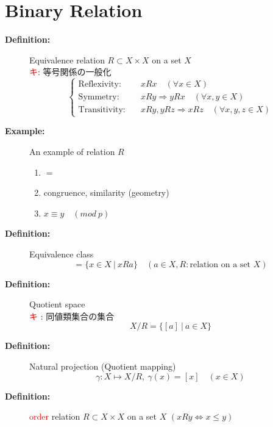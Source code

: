 \documentclass[english,dvipdfmx]{jsarticle}
\newcommand*{\point}{\textcircled{\textcolor{red}{\scriptsize キ}}}
\begin{document}
\section{Binary Relation}
\begin{description}
    \item[\bf{Definition:}] Equivalence relation $R \subset X \times X$ on a set $X$ \\
    \point : 等号関係の一般化
    \begin{equation*} \begin{cases}
        \text{Reflexivity} : \quad &xRx \quad ( \forall x \in X )  \\
        \text{Symmetry} : \quad  &xRy \Rightarrow yRx \quad ( \forall x,y \in X ) \\
        \text{Transitivity} : \quad &xRy , yRz \Rightarrow xRz \quad (\forall x,y,z \in X )
    \end{cases} 
    \end{equation*}
    \item[\bf{Example:}] An example of relation $R$
    \begin{enumerate}
        \item $ = $
        \item congruence, similarity (geometry)
        \item $x \equiv y \quad (mod \ p)$
    \end{enumerate} 
    \item[\bf{Definition:}] Equivalence class
    \begin{equation*}  
        [a] = \{ x \in X \ | \ xRa \} \quad ( a \in X , R : \text{relation on a set } X )
    \end{equation*}
    \item[\bf{Definition:}] Quotient space \\
    \textcircled{\textcolor{red}{\scriptsize キ}} : 同値類集合の集合
    \begin{equation*} 
    X / R = \{ [a] \ | \ a \in X \} 
    \end{equation*}
    \item[\bf{Definition:}] Natural projection (Quotient mapping)
    \begin{equation*} 
    \gamma : X \longmapsto X / R ,\ \gamma(x) = [x] \quad ( x \in X )
    \end{equation*}
    \item[\bf{Definition:}] \textcolor{red}{order} relation $R \subset X \times X$ on a set $X$ $( xRy \Leftrightarrow x\leq y)$ \\ 

\end{description}
\end{document}
